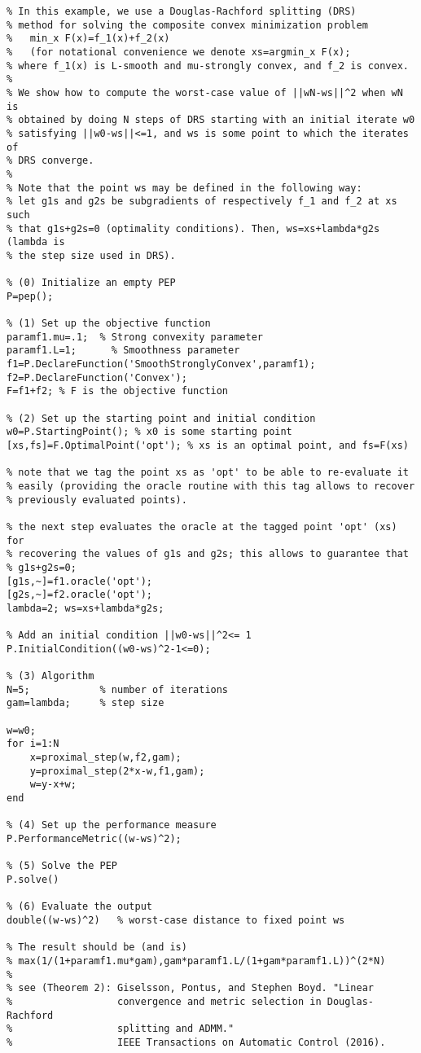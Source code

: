 \documentclass[11pt,a4paper]{article}
\begin{document}
\begin{lstlisting}
% In this example, we use a Douglas-Rachford splitting (DRS) 
% method for solving the composite convex minimization problem
%   min_x F(x)=f_1(x)+f_2(x) 
%   (for notational convenience we denote xs=argmin_x F(x);
% where f_1(x) is L-smooth and mu-strongly convex, and f_2 is convex.
%
% We show how to compute the worst-case value of ||wN-ws||^2 when wN is
% obtained by doing N steps of DRS starting with an initial iterate w0
% satisfying ||w0-ws||<=1, and ws is some point to which the iterates of
% DRS converge.
%
% Note that the point ws may be defined in the following way:
% let g1s and g2s be subgradients of respectively f_1 and f_2 at xs such 
% that g1s+g2s=0 (optimality conditions). Then, ws=xs+lambda*g2s (lambda is
% the step size used in DRS).

% (0) Initialize an empty PEP
P=pep();

% (1) Set up the objective function
paramf1.mu=.1;	% Strong convexity parameter
paramf1.L=1;      % Smoothness parameter
f1=P.DeclareFunction('SmoothStronglyConvex',paramf1);
f2=P.DeclareFunction('Convex');
F=f1+f2; % F is the objective function

% (2) Set up the starting point and initial condition
w0=P.StartingPoint(); % x0 is some starting point
[xs,fs]=F.OptimalPoint('opt'); % xs is an optimal point, and fs=F(xs)

% note that we tag the point xs as 'opt' to be able to re-evaluate it
% easily (providing the oracle routine with this tag allows to recover
% previously evaluated points).

% the next step evaluates the oracle at the tagged point 'opt' (xs) for
% recovering the values of g1s and g2s; this allows to guarantee that
% g1s+g2s=0;
[g1s,~]=f1.oracle('opt');
[g2s,~]=f2.oracle('opt');
lambda=2; ws=xs+lambda*g2s;

% Add an initial condition ||w0-ws||^2<= 1
P.InitialCondition((w0-ws)^2-1<=0); 

% (3) Algorithm
N=5;            % number of iterations
gam=lambda;		% step size

w=w0;
for i=1:N
    x=proximal_step(w,f2,gam);
    y=proximal_step(2*x-w,f1,gam);
    w=y-x+w;
end

% (4) Set up the performance measure
P.PerformanceMetric((w-ws)^2);

% (5) Solve the PEP
P.solve()

% (6) Evaluate the output
double((w-ws)^2)   % worst-case distance to fixed point ws

% The result should be (and is)
% max(1/(1+paramf1.mu*gam),gam*paramf1.L/(1+gam*paramf1.L))^(2*N) 
% 
% see (Theorem 2): Giselsson, Pontus, and Stephen Boyd. "Linear 
%                  convergence and metric selection in Douglas-Rachford
%                  splitting and ADMM."
%                  IEEE Transactions on Automatic Control (2016). 
\end{lstlisting}
\end{document}
